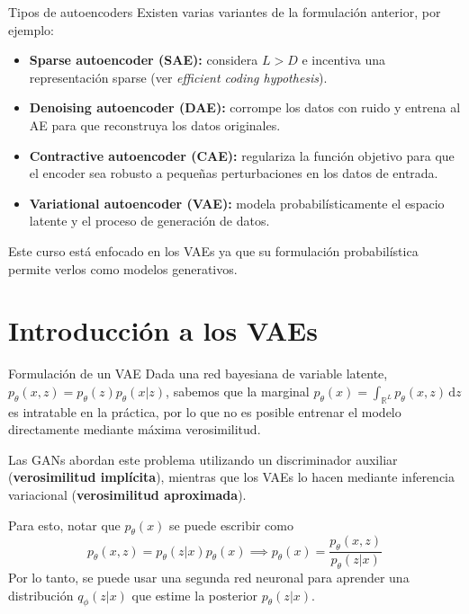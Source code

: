 \documentclass{beamer}
\newcommand{\R}{\mathbb{R}}
\begin{document}
\begin{frame}{Tipos de autoencoders}
    Existen varias variantes de la formulación anterior, por ejemplo:
    \vspace{-0.5cm}
    \begin{itemize}
        \item \textbf{Sparse autoencoder (SAE):} considera $L>D$ e incentiva una representación sparse (ver \textit{efficient coding hypothesis}).
        \item \textbf{Denoising autoencoder (DAE):} corrompe los datos con ruido y entrena al AE para que reconstruya los datos originales.
        \item \textbf{Contractive autoencoder (CAE):} regulariza la función objetivo para que el encoder sea robusto a pequeñas perturbaciones en los datos de entrada.
        \item \textbf{Variational autoencoder (VAE):} modela probabilísticamente el espacio latente y el proceso de generación de datos.
    \end{itemize}
    Este curso está enfocado en los VAEs ya que su formulación probabilística permite verlos como modelos generativos.
\end{frame}

\section{Introducción a los VAEs}

\begin{frame}{Formulación de un VAE}
    Dada una red bayesiana de variable latente, $p_\theta(x,z)=p_\theta(z)p_\theta(x|z)$, sabemos que la marginal $p_\theta(x)=\int_{\R^L} p_\theta(x,z)\,\text{d}z$ es intratable en la práctica, por lo que no es posible entrenar el modelo directamente mediante máxima verosimilitud.

    Las GANs abordan este problema utilizando un discriminador auxiliar (\textbf{verosimilitud implícita}), mientras que los VAEs lo hacen mediante inferencia variacional (\textbf{verosimilitud aproximada}).
    
    Para esto, notar que $p_\theta(x)$ se puede escribir como
    \begin{equation*}
        p_\theta(x,z)=p_\theta(z|x)p_\theta(x)\implies p_\theta(x)=\frac{p_\theta(x,z)}{p_\theta(z|x)}
    \end{equation*}
    Por lo tanto, se puede usar una segunda red neuronal para aprender una distribución $q_\phi(z|x)$ que estime la posterior $p_\theta(z|x)$.
\end{frame}
\end{document}
